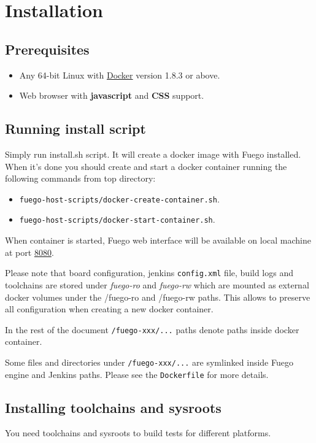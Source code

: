 \section{Installation}
\label{sec:install}

\subsection{Prerequisites}
\label{sec:prereq}

\begin{itemize}
\item Any 64-bit Linux with \href{https://www.docker.com/}{Docker} version 1.8.3 or above.
\item Web browser with \textbf{javascript} and \textbf{CSS} support.
\end{itemize}
\subsection{Running install script}
\label{sec:inst-steps}

Simply run install.sh script. It will create a docker image with Fuego installed. When it's done you should create and start a docker container running the following commands from top directory:
\begin{itemize}
\item \texttt{fuego-host-scripts/docker-create-container.sh}.
\item \texttt{fuego-host-scripts/docker-start-container.sh}.
\end{itemize}

When container is started, Fuego web interface will be available on local machine at port \href{http://localhost:8080}{8080}.

Please note that board configuration, jenkins \texttt{config.xml} file, build logs and toolchains are stored under \textit{fuego-ro} and \textit{fuego-rw} which are mounted as external docker volumes under the /fuego-ro and /fuego-rw paths. This allows to preserve all configuration when creating a new docker container.

In the rest of the document \texttt{/fuego-xxx/...} paths denote paths inside docker container.

Some files and directories under \texttt{/fuego-xxx/...} are symlinked inside Fuego engine and Jenkins paths. Please see the \texttt{Dockerfile} for more details.

\subsection{Installing toolchains and sysroots}
You need toolchains and sysroots to build tests for different platforms.
\label{sec:toolchain-install}
